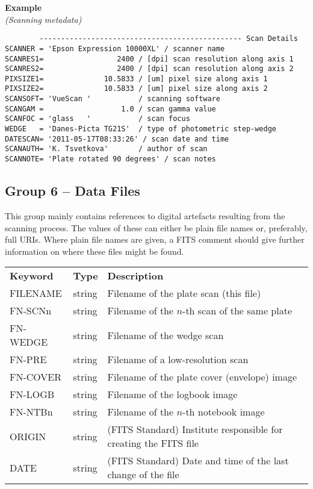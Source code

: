 \documentclass[11pt]{ivoa}
\newenvironment{fitsexample}[1]
{\bigskip\noindent\textbf{Example}\\\textit{(#1)\smallskip}}
{\medskip}
\begin{document}
\begin{fitsexample}{Scanning metadata}
\begin{lstlisting}
        ----------------------------------------------- Scan Details
SCANNER = 'Epson Expression 10000XL' / scanner name
SCANRES1=                 2400 / [dpi] scan resolution along axis 1
SCANRES2=                 2400 / [dpi] scan resolution along axis 2
PIXSIZE1=              10.5833 / [um] pixel size along axis 1
PIXSIZE2=              10.5833 / [um] pixel size along axis 2
SCANSOFT= 'VueScan '           / scanning software
SCANGAM =                  1.0 / scan gamma value
SCANFOC = 'glass   '           / scan focus
WEDGE   = 'Danes-Picta TG21S'  / type of photometric step-wedge
DATESCAN= '2011-05-17T08:33:26' / scan date and time
SCANAUTH= 'K. Tsvetkova'       / author of scan
SCANNOTE= 'Plate rotated 90 degrees' / scan notes
\end{lstlisting}
\end{fitsexample}


\subsection{Group 6 – Data Files}

This group mainly contains references to digital artefacts resulting
from the scanning process.  The values of these can either be plain file
names or, preferably, full URIs.  Where plain file names are given, a
FITS comment should give further information on where these files might
be found.

\begin{inlinetable}
\footnotesize
\begin{tabular}{llp{}}
\sptablerule
\textbf{Keyword}&\textbf{Type}&\textbf{Description}\\
\sptablerule
FILENAME &string    &Filename of the plate scan (this file)\\
FN-SCNn  &string    &
  Filename of the $n$-th scan of the same plate\\
FN-WEDGE &string    &Filename of the wedge scan\\
FN-PRE   &string    &
  Filename of a low-resolution scan\\
FN-COVER &string    &
  Filename of the plate cover (envelope) image\\
FN-LOGB  &string    &Filename of the logbook image\\
FN-NTBn  &string    &
  Filename of the $n$-th notebook image\\
ORIGIN   &string    &
  (FITS Standard) Institute responsible for creating the FITS file\\
DATE     &string    &
  (FITS Standard) Date and time of the last change of the file \\
\end{tabular}
\end{inlinetable}
\end{document}
